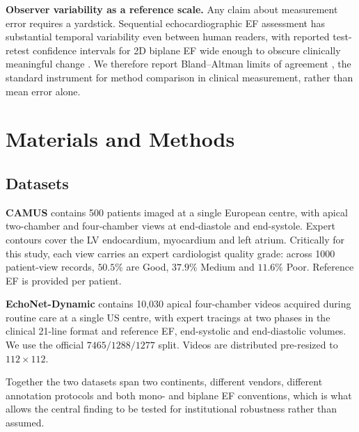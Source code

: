 \documentclass[conference,a4paper]{IEEEtran}
\begin{document}
\textbf{Observer variability as a reference scale.}
Any claim about measurement error requires a yardstick. Sequential echocardiographic EF
assessment has substantial temporal variability even between human readers, with reported
test-retest confidence intervals for 2D biplane EF wide enough to obscure clinically
meaningful change \cite{thavendiranathan2013}. We therefore report Bland--Altman limits of
agreement \cite{blandaltman1986}, the standard instrument for method comparison in clinical
measurement, rather than mean error alone.

\section{Materials and Methods}

\subsection{Datasets}
\textbf{CAMUS} \cite{leclerc2019} contains 500 patients imaged at a single European centre,
with apical two-chamber and four-chamber views at end-diastole and end-systole. Expert
contours cover the LV endocardium, myocardium and left atrium. Critically for this study,
each view carries an expert cardiologist quality grade: across 1000 patient-view records,
$50.5\%$ are Good, $37.9\%$ Medium and $11.6\%$ Poor. Reference EF is provided per patient.

\textbf{EchoNet-Dynamic} \cite{ouyang2020} contains 10{,}030 apical four-chamber videos
acquired during routine care at a single US centre, with expert tracings at two phases in
the clinical 21-line format and reference EF, end-systolic and end-diastolic volumes. We
use the official $7465 / 1288 / 1277$ split. Videos are distributed pre-resized to
$112 \times 112$.

Together the two datasets span two continents, different vendors, different annotation
protocols and both mono- and biplane EF conventions, which is what allows the central
finding to be tested for institutional robustness rather than assumed.
\end{document}
